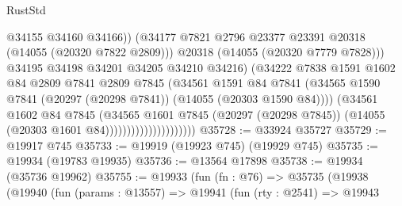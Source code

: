 \begin{lexlean}{RustStd}
\begin{coremodule}
                                            @34155
                                            @34160
                                            @34166))
                                        (@34177
                                          @7821
                                          @2796
                                          @23377
                                          @23391
                                          @20318
                                          (@14055 (@20320 @7822 @2809)))
                                        @20318
                                        (@14055 (@20320 @7779 @7828)))
                                      @34195
                                      @34198
                                      @34201
                                      @34205
                                      @34210
                                      @34216)
                                    (@34222
                                      @7838
                                      @1591
                                      @1602
                                      @84
                                      @2809
                                      @7841
                                      @2809
                                      @7845
                                      (@34561
                                        @1591
                                        @84
                                        @7841
                                        (@34565
                                          @1590
                                          @7841
                                          (@20297 (@20298 @7841))
                                          (@14055 (@20303 @1590 @84))))
                                      (@34561
                                        @1602
                                        @84
                                        @7845
                                        (@34565
                                          @1601
                                          @7845
                                          (@20297 (@20298 @7845))
                                          (@14055 (@20303 @1601 @84)))))))))))))))))))))
@35728 := @33924 @35727
@35729 := @19917 @745
@35733 := @19919 (@19923 @745) (@19929 @745)
@35735 := @19934 (@19783 @19935)
@35736 := @13564 @17898
@35738 := @19934 (@35736 @19962)
@35755 := @19933
    (fun (fn : @76) =>
    @35735
      (@19938
        (@19940
          (fun (params : @13557) =>
          @19941
            (fun (rty : @2541) =>
            @19943

\end{coremodule}
\end{lexlean}
